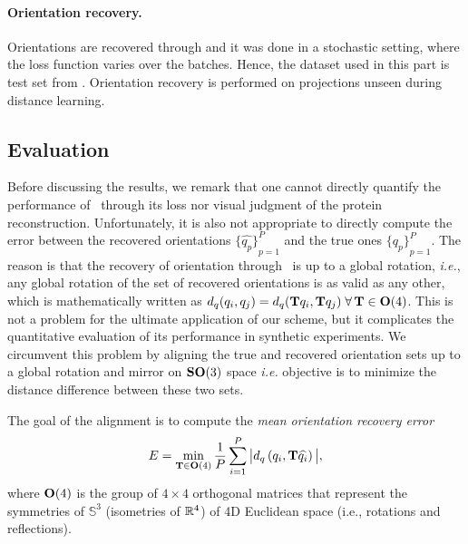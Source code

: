 \paragraph{Orientation recovery.}
Orientations are recovered through  and it was done in a stochastic setting, where the loss function varies over the batches.
Hence, the dataset used in this part is test set from .
Orientation recovery is performed on projections unseen during distance learning.

\subsection{Evaluation}\label{sec:results:evaluation}



Before discussing the results, we remark that one cannot directly quantify the performance of~ through its loss nor visual judgment of the protein reconstruction.
Unfortunately, it is also not appropriate to directly compute the error between the recovered orientations ${\big\{\widehat{q_p}\big\}}_{p=1}^P$ and the true ones ${\big\{q_p\big\}}_{p=1}^P$.
The reason is that the recovery of orientation through~ is up to a global rotation, \textit{i.e.}, any global rotation of the set of recovered orientations is as valid as any other, which is mathematically written as $d_q(q_i, q_j) = d_q(\mathbf{T} q_i , \mathbf{T} q_j) \; \forall \, \mathbf{T} \in \mathrm{\mathbf{O}}(4)$.
This is not a problem for the ultimate application of our scheme, but it complicates the quantitative evaluation of its performance in synthetic experiments.
We circumvent this problem by aligning the true and recovered orientation sets up to a global rotation and mirror on $\mathrm{\mathbf{SO}}(3)$ space \textit{i.e.} objective is to minimize the distance difference between these two sets.

The goal of the alignment is to compute the \textit{mean orientation recovery error}
\begin{equation}
    E = \min_{\mathbf{T} \in \mathrm{\mathbf{O}}(4)} \frac{1}{P} \sum_{i=1}^P \big| d_q\left( q_i, \mathbf{T} \widehat{q_i} \right) \big|,
    \label{eqn:orientation-recovery-error}
\end{equation}
where $\mathrm{\mathbf{O}}(4)$ is the group of $4 \times 4$ orthogonal matrices that represent the symmetries of $\mathbb{S}^3$ (isometries of $\mathbb{R}^4$) of 4D Euclidean space (i.e., rotations and reflections).


